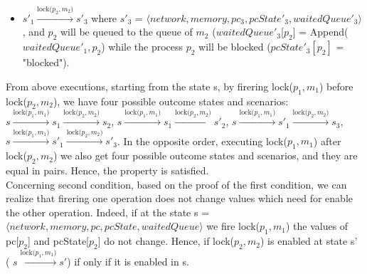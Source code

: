 \documentclass[a4paper,11pt]{article}
\begin{document}
\begin{appendices}
\begin{itemize}
\begin{itemize}
  	  	\item  $s'_1\xrightarrow{\text{lock($p_2, m_2$)}}s'_3$ where $s'_3$ = $\langle network, memory, pc_3, pcState'_3, waitedQueue'_3 \rangle$, and $p_2$ will be queued to the queue of $m_2$ ($waitedQueue'_3$[$p_2$] = Append($waitedQueue'_1 ,p_2$) while the process $p_2$ will be blocked ($pcState'_3[p_2]$ = "blocked"). 
  	  \end{itemize}
  \end{itemize}
 From above executions, starting from the state s, by firering lock($p_1,m_1$) before  lock($p_2, m_2$), we have four possible outcome states and scenarios:  $s\xrightarrow{\text{lock($p_1, m_1$)}}s_1 \xrightarrow{\text{lock($p_2, m_2$)}}s_2$, $s\xrightarrow{\text{lock($p_1, m_1$)}}s_1 \xrightarrow{\text{lock($p_2, m_2$)}}s'_2$, $s\xrightarrow{\text{lock($p_1, m_1$)}}s'_1 \xrightarrow{\text{lock($p_2, m_2$)}}s_3$, $s\xrightarrow{\text{lock($p_1, m_1$)}}s'_1 \xrightarrow{\text{lock($p_2, m_2$)}}s'_3$. In the opposite order, executing lock($p_1,m_1$) after lock($p_2, m_2$) we also get four possible outcome states and scenarios, and they are equal in pairs. Hence, the property is satisfied. \\
 
 Concerning second condition, based on the proof of the first condition, we can realize that firering one operation does not change values which need for enable the other operation. Indeed, if at the state s = $\langle network, memory, pc, pcState, waitedQueue \rangle$ we fire lock($p_1,m_1$) the values of pc[$p_2$] and pcState[$p_2$] do not change. Hence, if lock($p_2,m_2$) is enabled at state s' ( $s\xrightarrow{\text{lock($p_1, m_1$)}}s'$) if only if it is enabled in s. 
\end{appendices}
\end{document}
